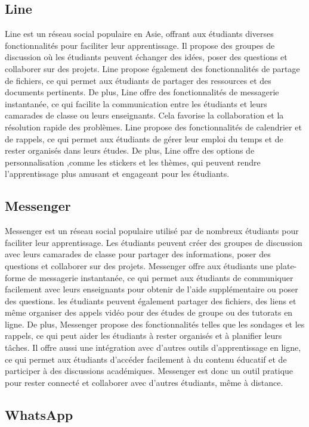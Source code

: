 \documentclass[12pt,a4paper,titlepage]{article}
\begin{document}
\subsection{Line}
Line est un réseau social populaire en Asie, offrant aux étudiants diverses fonctionnalités pour faciliter leur apprentissage. Il propose des groupes de discussion où les étudiants peuvent échanger des idées, poser des questions et collaborer sur des projets. Line propose également des fonctionnalités de partage de fichiers, ce qui permet aux étudiants de partager des ressources et des documents pertinents. De plus, Line offre des fonctionnalités de messagerie instantanée, ce qui facilite la communication entre les étudiants et leurs camarades de classe ou leurs enseignants. Cela favorise la collaboration et la résolution rapide des problèmes. Line propose des fonctionnalités de calendrier et de rappels, ce qui permet aux étudiants de gérer leur emploi du temps et de rester organisés dans leurs études. De plus, Line offre des options de personnalisation ,comme les stickers et les thèmes, qui peuvent rendre l'apprentissage plus amusant et engageant pour les étudiants.
\subsection{Messenger }
Messenger est un réseau social populaire utilisé par de nombreux étudiants pour faciliter leur apprentissage. Les étudiants peuvent créer des groupes de discussion avec leurs camarades de classe pour partager des informations, poser des questions et collaborer sur des projets. Messenger offre aux étudiants une plate-forme de messagerie instantanée, ce qui permet aux étudiants de communiquer facilement avec leurs enseignants pour obtenir de l'aide supplémentaire ou poser des questions.  les étudiants peuvent également partager des fichiers, des liens et même organiser des appels vidéo pour des études de groupe ou des tutorats en ligne. De plus, Messenger propose des fonctionnalités telles que les sondages et les rappels, ce qui peut aider les étudiants à rester organisés et à planifier leurs tâches. Il offre aussi une intégration avec d'autres outils d'apprentissage en ligne, ce qui permet aux étudiants d'accéder facilement à du contenu éducatif et de participer à des discussions académiques. Messenger est donc un outil pratique pour rester connecté et collaborer avec d'autres étudiants, même à distance.
\subsection{WhatsApp}
\end{document}
